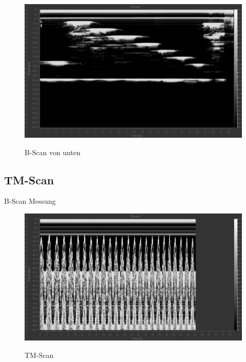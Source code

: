 \begin{figure}
	\centering
	\caption{B-Scan von unten}
	\includegraphics[width=\linewidth-40pt,height=\textheight-40pt,keepaspectratio]{content/images/B-Scan-unten.jpg}
	\label{fig:B-Scan-unten}
\end{figure}

\subsection{TM-Scan}

\begin{table}
	\centering
	\caption{B-Scan Messung}
	
	\label{tab:TMScan}
\end{table}

\begin{figure}
	\centering
	\caption{TM-Scan}
	\includegraphics[width=\linewidth-40pt,height=\textheight-40pt,keepaspectratio]{content/images/TM-Scan.jpg}
	\label{fig:TM-Scan}
\end{figure}